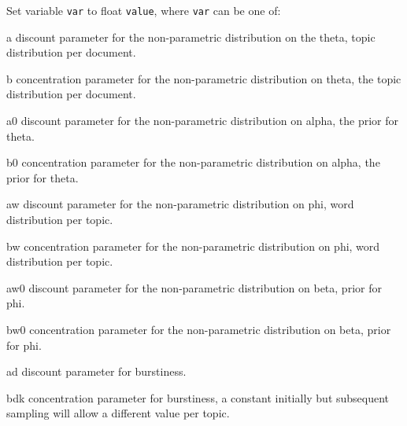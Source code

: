 \documentclass[a4paper,english]{article}
\begin{document}
\begin{Description}
\begin{Description}[hpdd]
\end{Description}
\item[\OptArg{-S}{var=value}]  Set variable \texttt{var} to float \texttt{value},
where \texttt{var} can be one of:
\begin{Description}[bdk]
\item[a] discount parameter for the non-parametric distribution
  on the theta, topic distribution per document.
\item[b] concentration parameter for the non-parametric distribution
  on theta, the topic distribution per document.
\item[a0] discount parameter for the non-parametric distribution
  on alpha, the prior for theta.
\item[b0] concentration parameter for the non-parametric distribution
  on alpha, the prior for theta.
\item[aw] discount parameter for the non-parametric distribution
  on phi, word distribution per topic.
\item[bw] concentration parameter for the non-parametric distribution
  on phi, word distribution per topic.
\item[aw0] discount parameter for the non-parametric distribution
  on beta, prior for phi.
\item[bw0] concentration parameter for the non-parametric distribution
  on beta, prior for phi.
\item[ad] discount parameter for burstiness.
\item[bdk] concentration parameter for burstiness, a constant initially
     but subsequent sampling will allow a different value per topic.
\end{Description}
\end{Description}
\end{document}
